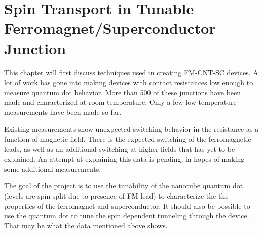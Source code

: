 
\chapter{Spin Transport in Tunable Ferromagnet/Superconductor Junction}
\label{sec:SCFM}

This chapter will first discuss techniques used in creating FM-CNT-SC devices. A lot of work has gone into making devices with contact resistances low enough to measure quantum dot behavior. More than 500 of these junctions have been made and characterized at room temperature. Only a few low temperature measurements have been made so far.

Existing measurements show unexpected switching behavior in the resistance as a function of magnetic field. There is the expected switching of the ferromagnetic leads, as well as an additional switching at higher fields that has yet to be explained. An attempt at explaining this data is pending, in hopes of making some additional measurements.

The goal of the project is to use the tunability of the  nanotube quantum dot (levels are spin split due to presence of FM lead) to characterize the the properties of the ferromagnet and superconductor. It should also be possible to use the quantum dot to tune the spin dependent tunneling through the device. That may be what the data mentioned above shows. 